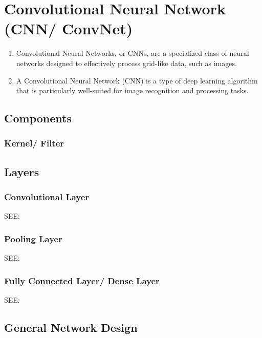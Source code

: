 \chapter{Convolutional Neural Network (CNN/ ConvNet) \cite{gfg-convolutional-neural-network-cnn-in-machine-learning}}\label{Convolutional Neural Network}

\begin{enumerate}
    \item Convolutional Neural Networks, or CNNs, are a specialized class of neural networks designed to effectively process grid-like data, such as images.

    \item A Convolutional Neural Network (CNN) is a type of deep learning algorithm that is particularly well-suited for image recognition and processing tasks.
\end{enumerate}


\section{Components}
\subsection{Kernel/ Filter}


\section{Layers}
\subsection{Convolutional Layer}

SEE: 


\subsection{Pooling Layer}

SEE: 


\subsection{Fully Connected Layer/ Dense Layer}
SEE: 



\section{General Network Design \cite{gfg-convolutional-neural-network-cnn-in-machine-learning}}\label{cnn: General Network Design}

